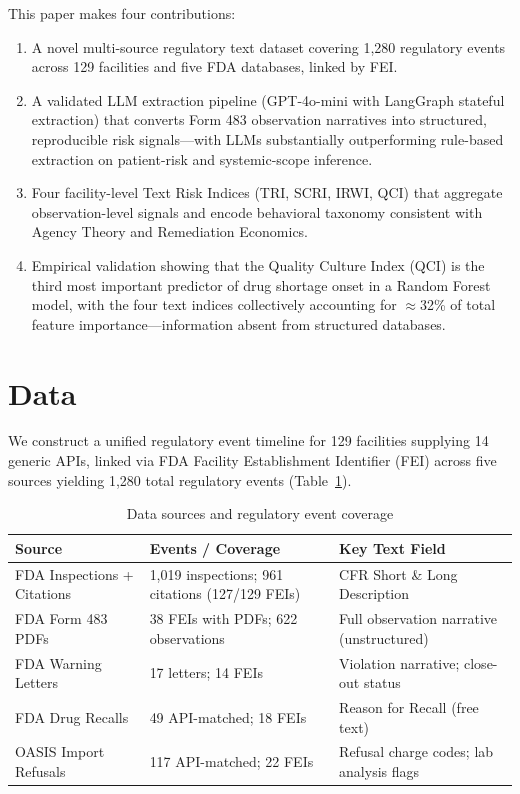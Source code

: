 \documentclass[12pt]{article}
\begin{document}
This paper makes four contributions:
\begin{enumerate}[noitemsep]
  \item A novel multi-source regulatory text dataset covering 1,280 regulatory
        events across 129 facilities and five FDA databases, linked by FEI.
  \item A validated LLM extraction pipeline (GPT-4o-mini with LangGraph stateful
        extraction) that converts Form 483 observation narratives into structured,
        reproducible risk signals---with LLMs substantially outperforming
        rule-based extraction on patient-risk and systemic-scope inference.
  \item Four facility-level Text Risk Indices (TRI, SCRI, IRWI, QCI) that
        aggregate observation-level signals and encode behavioral taxonomy
        consistent with Agency Theory and Remediation Economics.
  \item Empirical validation showing that the Quality Culture Index (QCI) is the
        third most important predictor of drug shortage onset in a Random Forest
        model, with the four text indices collectively accounting for $\approx$32\%
        of total feature importance---information absent from structured databases.
\end{enumerate}

\section{Data}
\label{sec:data}

We construct a unified regulatory event timeline for 129 facilities supplying
14 generic APIs, linked via FDA Facility Establishment Identifier (FEI) across
five sources yielding 1,280 total regulatory events (Table~\ref{tab:data}).

\begin{table}[h!]
\centering
\caption{Data sources and regulatory event coverage}
\label{tab:data}
\begin{tabular}{p{3.8cm} p{4.2cm} p{4.4cm}}
\toprule
\textbf{Source} & \textbf{Events / Coverage} & \textbf{Key Text Field} \\
\midrule
FDA Inspections + Citations & 1,019 inspections; 961 citations (127/129 FEIs) & CFR Short \& Long Description \\
FDA Form 483 PDFs & 38 FEIs with PDFs; 622 observations & Full observation narrative (unstructured) \\
FDA Warning Letters & 17 letters; 14 FEIs & Violation narrative; close-out status \\
FDA Drug Recalls & 49 API-matched; 18 FEIs & Reason for Recall (free text) \\
OASIS Import Refusals & 117 API-matched; 22 FEIs & Refusal charge codes; lab analysis flags \\
\bottomrule
\end{tabular}
\end{table}
\end{document}
